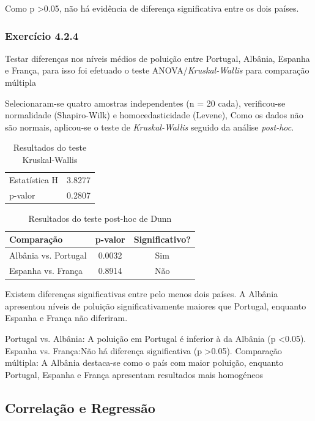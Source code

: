 \documentclass[conference]{IEEEtran}
\begin{document}
Como p \textgreater 0.05, não há evidência de diferença significativa entre os dois países. 
\medskip
\subsubsection{\textbf{Exercício 4.2.4}}
	Testar diferenças nos níveis médios de poluição entre Portugal, Albânia, Espanha e França, para isso foi efetuado o teste ANOVA/\textit{Kruskal-Wallis} para comparação múltipla

Selecionaram-se quatro amostras independentes (n = 20 cada), verificou-se normalidade (Shapiro-Wilk) e homocedasticidade (Levene),
Como os dados não são normais, aplicou-se o teste de \textit{Kruskal-Wallis} seguido da análise \textit{post-hoc}.

	\begin{table}[H]
		\centering
		\caption{Resultados do teste Kruskal-Wallis}
		\begin{tabular}{lc}
			\toprule
			Estatística H & 3.8277 \\
			p-valor & 0.2807 \\
			\bottomrule
		\end{tabular}
	\end{table}

	\begin{table}[H]
		\centering
		\caption{Resultados do teste post-hoc de Dunn}
		\begin{tabular}{lcc}
			\toprule
			Comparação & p-valor & Significativo? \\
			\midrule
			Albânia vs. Portugal & 0.0032 & Sim \\
			Espanha vs. França & 0.8914 & Não \\
			\bottomrule
		\end{tabular}
	\end{table}

Existem diferenças significativas entre pelo menos dois países. A Albânia apresentou níveis de poluição significativamente maiores que Portugal, enquanto Espanha e França não diferiram. 

Portugal vs. Albânia: A poluição em Portugal é inferior à da Albânia (p \textless 0.05).
Espanha vs. França:Não há diferença significativa (p \textgreater 0.05).
Comparação múltipla: A Albânia destaca-se como o país com maior poluição, enquanto Portugal, Espanha e França apresentam resultados mais homogéneos

	
\subsection{Correlação e Regressão}\label{AA}
\end{document}
